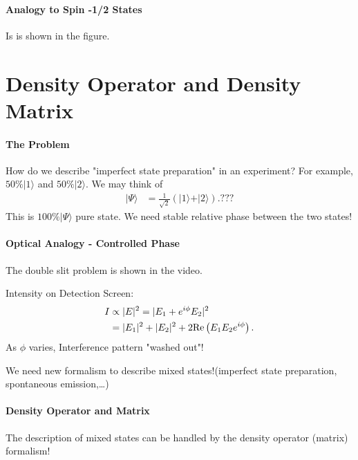 \documentclass[../../note.tex]{subfiles}
\begin{document}
\paragraph{Analogy to Spin -1/2 States}
Is is shown in the figure.

\section{Density Operator and Density Matrix}
\paragraph{The Problem}
How do we describe "imperfect state preparation" in an experiment? For example, $50 \% \vert 1 \rangle$ and $50 \% \vert 2 \rangle$. We may think of 
\begin{align}
    \vert \Psi \rangle 
    &= \frac{1}{\sqrt{2}} \left(\vert 1 \rangle + \vert 2 \rangle \right). ???
\end{align}
This is $100 \% \vert \Psi \rangle$ pure state. We need stable relative phase between the two states!

\paragraph{Optical Analogy - Controlled Phase}
The double slit problem is shown in the video.

Intensity on Detection Screen:
\begin{align}
    I 
    &\propto \vert E \vert^2 = \vert E_1 + e^{i \phi} E_2 \vert^2 \\
    &= \vert E_1 \vert^2 + \vert E_2 \vert^2 + 2 {\rm Re}\left(E_1 E_2 e^{i \phi}\right).
\end{align}
As $\phi$ varies, Interference pattern "washed out"!

We need new formalism to describe mixed states!(imperfect state preparation, spontaneous emission,\dots)

\paragraph{Density Operator and Matrix}
The description of mixed states can be handled by the density operator (matrix) formalism!
\end{document}

